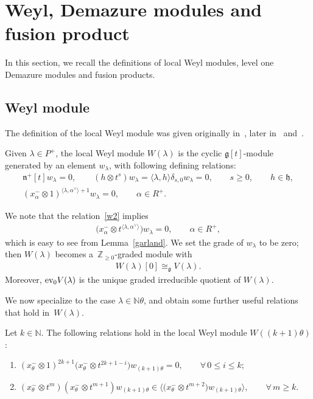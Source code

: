 \documentclass[pdftex]{sigma}
\numberwithin{equation}{section}
\begin{document}
\section{Weyl, Demazure modules and fusion product}\label{section3}

In this section, we recall the def\/initions of local Weyl modules, level one Demazure modules and fusion products.

\subsection{Weyl module}\label{section3.1}

The def\/inition of the local Weyl module was given originally in~\cite{CP}, later in~\cite{CFK} and~\cite{FL}.
\begin{definition}
Given $\lambda \in P^+$, the local Weyl module $W(\lambda)$ is the cyclic $\mathfrak{g}[t]$-module generated by an
element $w_\lambda$, with following def\/ining relations:
\begin{gather}
\mathfrak{n}^{+}[t]  w_\lambda=0,
\qquad
(h \otimes t^s)  w_\lambda = \langle \lambda, h \rangle \delta_{s,0} w_\lambda=0,
\qquad
s\geq0,
\qquad
h\in\mathfrak{h},
\nonumber
\\
(x^{-}_\alpha \otimes 1)^{\langle \lambda,
\alpha^{\vee} \rangle + 1}w_\lambda=0,
\qquad
\alpha \in R^{+}.
\label{w2}
\end{gather}
\end{definition}
\noindent We note that the relation~\eqref{w2} implies
\begin{gather}
\label{w2'}
\big(x^{-}_\alpha \otimes t^{\langle \lambda,
\alpha^{\vee} \rangle}\big)  w_\lambda=0,
\qquad
\alpha \in R^{+},
\end{gather}
which is easy to see from Lemma~\ref{garland}.
We set the grade of $w_\lambda$ to be zero; then $W(\lambda)$ becomes a~$\mathbb{Z}_{\geq 0}$-graded module with
\begin{gather*}
W(\lambda)[0] \cong_{\mathfrak{g}} V(\lambda).
\end{gather*}
Moreover, $\textup{ev}_0 V(\lambda)$ is the unique graded irreducible quotient of $W(\lambda)$.

We now specialize to the case $\lambda\in \mathbb{N}\theta$, and obtain some further useful relations that hold in~$W(\lambda)$.
\begin{lemma}
\label{g}
Let $k\in\mathbb{N}$.
The following relations hold in the local Weyl module $W((k+1)\theta)$:
\begin{enumerate}\itemsep=0pt
\item[$1)$] $(x^{-}_{\theta}\otimes 1)^{2k+1}\big(x^{-}_{\theta}\otimes t^{2k+1-i}\big)w_{(k+1)\theta}=0,
\qquad
\forall\,
0\leq i \leq k$;
\item[$2)$] $(x^{-}_{\theta}\otimes t^m)(x^{-}_{\theta} \otimes t^{m+1})  w_{(k+1)\theta} \in  \big\langle \big(x^{-}_{\theta}
\otimes t^{m+2}\big) w_{(k+1)\theta} \rangle,
\qquad
\forall\,
m\geq k$.
\end{enumerate}
\end{lemma}
\end{document}
